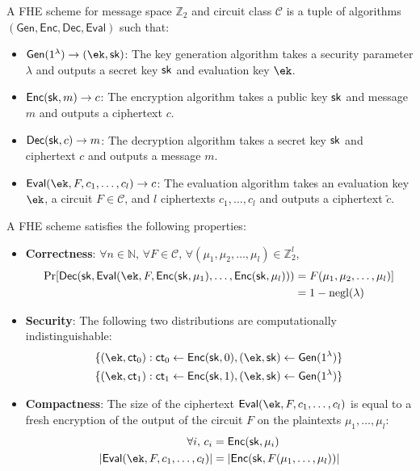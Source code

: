 \begin{definition}
    A FHE scheme for message space $\mathbb{Z}_2$ and circuit class $\mathcal{C}$ is a tuple of algorithms $(\mathsf{Gen}, \mathsf{Enc}, \mathsf{Dec}, \mathsf{Eval})$ such that:
    \begin{itemize}
        \item $\mathsf{Gen}(1^\lambda) \rightarrow (\ek, \sk)$: The key generation algorithm takes a security parameter $\lambda$ and outputs a secret key $\mathsf{sk}$ and evaluation key $\ek$.
        \item $\mathsf{Enc}(\mathsf{sk}, m) \rightarrow c$: The encryption algorithm takes a public key $\mathsf{sk}$ and message $m$ and outputs a ciphertext $c$.
        \item $\mathsf{Dec}(\mathsf{sk}, c) \rightarrow m$: The decryption algorithm takes a secret key $\mathsf{sk}$ and ciphertext $c$ and outputs a message $m$.
        \item $\mathsf{Eval}(\ek, F, c_1, \ldots, c_l) \rightarrow c$: The evaluation algorithm takes an evaluation key $\ek$, a circuit $F \in \mathcal{C}$, and $l$ ciphertexts $c_1, \ldots, c_l$ and outputs a ciphertext $\tilde{c}$.
    \end{itemize}
\end{definition}

A FHE scheme satisfies the following properties:
\begin{itemize}
    \item \textbf{Correctness}: $\forall n \in \mathbb{N},\, \forall F \in \mathcal{C},\, \forall (\mu_1, \mu_2, \dots, \mu_l) \in \mathbb{Z}_2^l$,
    \begin{align*}
        \Pr[\mathsf{Dec}(\sk, \mathsf{Eval}(\ek, F, \mathsf{Enc}(\sk, \mu_1), \dots, \mathsf{Enc}(\sk, \mu_l))) &= F(\mu_1, \mu_2, \dots, \mu_l)] \\
        &= 1 - \text{negl}(\lambda)
    \end{align*}

    \item \textbf{Security}: The following two distributions are computationally indistinguishable:
    \begin{align*}
        \{(\ek, \mathsf{ct}_0): \mathsf{ct}_0 \gets \mathsf{Enc}(\sk, 0), (\ek, \sk) \gets \mathsf{Gen}(1^\lambda)\} \\
        \{(\ek, \mathsf{ct}_1): \mathsf{ct}_1 \gets \mathsf{Enc}(\sk, 1), (\ek, \sk) \gets \mathsf{Gen}(1^\lambda)\}
    \end{align*}

    \item \textbf{Compactness}: The size of the ciphertext $\mathsf{Eval}(\ek, F, c_1, \ldots, c_l)$ is equal to a fresh encryption of the output of the circuit $F$ on the plaintexts $\mu_1, \ldots, \mu_l$:
    \begin{align*}
        \forall i,\, c_i &= \mathsf{Enc}(\sk, \mu_i) \\
        \lvert \mathsf{Eval}(\ek, F, c_1, \ldots, c_l) \rvert &= \lvert \mathsf{Enc}(\sk, F(\mu_1, \ldots, \mu_l)) \rvert
    \end{align*}
\end{itemize}

